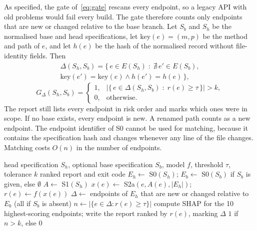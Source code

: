 \documentclass[conference]{IEEEtran}
\begin{document}
As specified, the gate of~\eqref{eq:gate} rescans every endpoint, so a legacy API with old
problems would fail every build. The gate therefore counts only endpoints that are new or
changed relative to the base branch. Let $S_b$ and $S_h$ be the normalised base and head
specifications, let $\mathrm{key}(e)=(m,p)$ be the method and path of $e$, and let $h(e)$ be the hash
of the normalised record without file-identity fields. Then
\begin{multline}
\Delta(S_h,S_b)=\bigl\{\,e\in E(S_h)\;:\;\nexists\,e'\in E(S_b),\\
\mathrm{key}(e')=\mathrm{key}(e)\wedge h(e')=h(e)\,\bigr\},
\end{multline}
\begin{equation}
G_{\Delta}(S_h,S_b)=
\begin{cases}
1, & \bigl|\{\,e\in\Delta(S_h,S_b)\;:\;r(e)\ge\tau\,\}\bigr|>k,\\
0, & \text{otherwise.}
\end{cases}
\label{eq:gatedelta}
\end{equation}
The report still lists every endpoint in risk order and marks which ones were in scope. If no
base exists, every endpoint is new. A renamed path counts as a new endpoint. The endpoint
identifier of S0 cannot be used for matching, because it contains the specification hash and
changes whenever any line of the file changes. Matching costs $O(n)$ in the number of
endpoints.

\begin{algorithm}[!t]
\caption{Runtime scan with changed-endpoint gate (S0--S3)}
\label{alg:scan}
\footnotesize
\begin{algorithmic}[1]
\REQUIRE head specification $S_h$, optional base specification $S_b$, model $f$, threshold $\tau$, tolerance $k$
\ENSURE ranked report and exit code
\STATE $E_h\leftarrow$ S0$(S_h)$;\; $E_b\leftarrow$ S0$(S_b)$ if $S_b$ is given, else $\emptyset$
\STATE $A\leftarrow$ S1$(S_h)$ 
  \STATE $x(e)\leftarrow$ S2a$(e,A(e),|E_h|)$;\; $r(e)\leftarrow f(x(e))$
\ENDFOR
\STATE $\Delta\leftarrow$ endpoints of $E_h$ that are new or changed relative to $E_b$ (all if $S_b$ is absent)
\STATE $n\leftarrow|\{e\in\Delta : r(e)\ge\tau\}|$
\STATE compute SHAP for the 10 highest-scoring endpoints; write the report ranked by $r(e)$, marking $\Delta$
\RETURN $1$ if $n>k$, else $0$
\end{algorithmic}
\end{algorithm}
\end{document}
